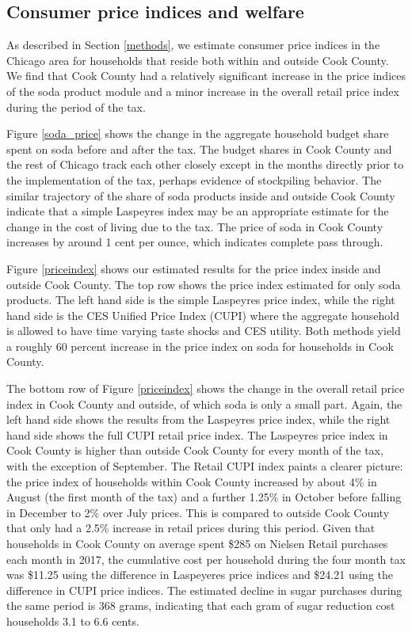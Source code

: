 \documentclass[12pt]{article}
\begin{document}
\subsection{Consumer price indices and welfare}

As described in Section \ref{methods}, we estimate consumer price indices in the Chicago area for households that reside both within and outside Cook County. We find that Cook County had a relatively significant increase in the price indices of the soda product module and a minor increase in the overall retail price index during the period of the tax.

Figure \ref{soda_price} shows the change in the aggregate household budget share spent on soda before and after the tax. The budget shares in Cook County and the rest of Chicago track each other closely except in the months directly prior to the implementation of the tax, perhaps evidence of stockpiling behavior. The similar trajectory of the share of soda products inside and outside Cook County indicate that a simple Laspeyres index may be an appropriate estimate for the change in the cost of living due to the tax. The price of soda in Cook County increases by around 1 cent per ounce, which indicates complete pass through.

Figure \ref{priceindex} shows our estimated results for the price index inside and outside Cook County. The top row shows the price index estimated for only soda products. The left hand side is the simple Laspeyres price index, while the right hand side is the CES Unified Price Index (CUPI) where the aggregate household is allowed to have time varying taste shocks and CES utility. Both methods yield a roughly 60 percent increase in the price index on soda for households in Cook County.

The bottom row of Figure \ref{priceindex} shows the change in the overall retail price index in Cook County and outside, of which soda is only a small part. Again, the left hand side shows the results from the Laspeyres price index, while the right hand side shows the full CUPI retail price index. The Laspeyres price index in Cook County is higher than outside Cook County for every month of the tax, with the exception of September. The Retail CUPI index paints a clearer picture: the price index of households within Cook County increased by about 4\% in August (the first month of the tax) and a further 1.25\% in October before falling in December to 2\% over July prices. This is compared to outside Cook County that only had a 2.5\% increase in retail prices during this period. Given that households in Cook County on average spent \$285 on Nielsen Retail purchases each month in 2017, the cumulative cost per household during the four month tax was \$11.25 using the difference in Laspeyeres price indices and \$24.21 using the difference in CUPI price indices. The estimated decline in sugar purchases during the same period is 368 grams, indicating that each gram of sugar reduction cost households 3.1 to 6.6 cents.
\end{document}
